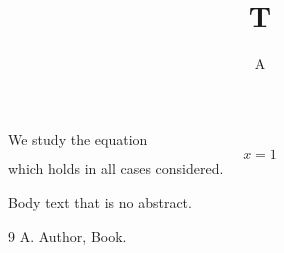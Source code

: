 \documentclass{article}
\begin{document}
\title{T}\author{A}\maketitle
\abstract
We study the equation
$$x=1$$
which holds in all cases considered.

 Body text that is no abstract.
\begin{thebibliography}{9}
 A. Author, Book.
\end{thebibliography}
\end{document}
